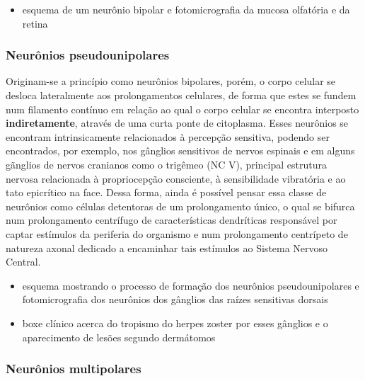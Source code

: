 \documentclass[
]{book}
\providecommand{\tightlist}{%
  \setlength{\itemsep}{0pt}\setlength{\parskip}{0pt}}
\theoremstyle{definition}
\theoremstyle{definition}
\theoremstyle{definition}
\theoremstyle{definition}
\theoremstyle{remark}
\begin{document}
\begin{itemize}
\tightlist
\item
  esquema de um neurônio bipolar e fotomicrografia da mucosa olfatória e da retina
\end{itemize}

\hypertarget{neuruxf4nios-pseudounipolares}{%
\subsubsection*{Neurônios pseudounipolares}\label{neuruxf4nios-pseudounipolares}}

Originam-se a princípio como neurônios bipolares, porém, o corpo celular se desloca lateralmente aos prolongamentos celulares, de forma que estes se fundem num filamento contínuo em relação ao qual o corpo celular se encontra interposto \textbf{indiretamente}, através de uma curta ponte de citoplasma. Esses neurônios se encontram intrinsicamente relacionados à percepção sensitiva, podendo ser encontrados, por exemplo, nos gânglios sensitivos de nervos espinais e em alguns gãnglios de nervos cranianos como o trigêmeo (NC V), principal estrutura nervosa relacionada à propriocepção consciente, à sensibilidade vibratória e ao tato epicrítico na face. Dessa forma, ainda é possível pensar essa classe de neurônios como células detentoras de um prolongamento único, o qual se bifurca num prolongamento centrífugo de características dendríticas responsável por captar estímulos da periferia do organismo e num prolongamento centrípeto de natureza axonal dedicado a encaminhar tais estímulos ao Sistema Nervoso Central.

\begin{itemize}
\item
  esquema mostrando o processo de formação dos neurônios pseudounipolares e fotomicrografia dos neurônios dos gânglios das raízes sensitivas dorsais
\item
  boxe clínico acerca do tropismo do herpes zoster por esses gânglios e o aparecimento de lesões segundo dermátomos
\end{itemize}

\hypertarget{neuruxf4nios-multipolares}{%
\subsubsection*{Neurônios multipolares}\label{neuruxf4nios-multipolares}}
\end{document}
